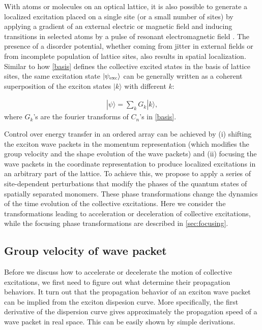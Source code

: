 With atoms or molecules on an optical lattice, it is also possible to generate a localized excitation placed on a single site
 (or a small number of sites) by applying a gradient of an external electric or magnetic field and inducing transitions in
 selected atoms by a pulse of resonant electromagnetic field \cite{demille}. The presence of a disorder potential, 
whether coming from jitter in external fields or from incomplete population of lattice sites,  also results in spatial 
localization. Similar to how \autoref{basis} defines the collective excited states in the basis of lattice sites, 
the same excitation state $|\psi_{\rm exc}\rangle$ can be generally written as a coherent superposition of the exciton states
 $|k\rangle$ with different $k$:

\begin{eqnarray}
| \psi \rangle = \sum_{k} G_k | k \rangle ,
\label{k-rep}
\end{eqnarray}
where $G_k$'s are the fourier transforms of $C_n$'s in \autoref{basis}. 

Control over energy transfer in an ordered array can be achieved
by (i) shifting the exciton wave packets in the momentum
representation (which modifies the group velocity and the shape
evolution of the wave packets) and (ii) focusing the wave packets
in the coordinate representation to produce localized excitations
in an arbitrary part of the lattice. To achieve this, we propose
to apply a series of site-dependent perturbations  that modify the phases of the quantum states of spatially separated monomers. 
These phase transformations change the dynamics of the time evolution of the collective excitations. 
Here we consider the transformations leading to acceleration or deceleration of collective excitations, while   
 the focusing phase transformations are described in \autoref{sec:focusing}. 

\subsection{Group velocity of wave packet}
\label{sec:groupVelocity} 

Before we discuss how to accelerate or decelerate the motion of collective excitations, we first need to figure out 
what determine their propagation behaviors.  It turn out that the propagation behavior of an exciton wave packet can be implied from the exciton dispesion curve. More specifically, the first derivative of the dispersion curve
gives approximately the propagation speed of a wave packet in real space. This can be easily shown by  simple derivations. 

